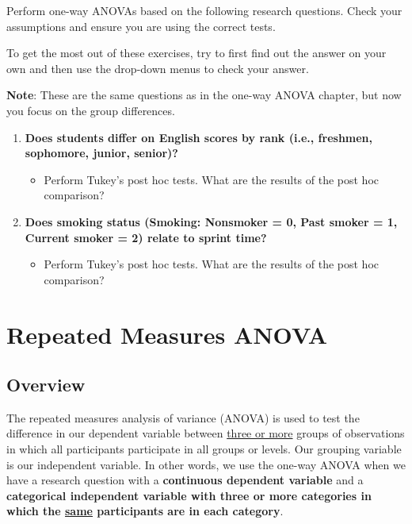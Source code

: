 \documentclass[
]{book}
\providecommand{\tightlist}{%
  \setlength{\itemsep}{0pt}\setlength{\parskip}{0pt}}
\begin{document}
Perform one-way ANOVAs based on the following research questions. Check your assumptions and ensure you are using the correct tests.

To get the most out of these exercises, try to first find out the answer on your own and then use the drop-down menus to check your answer.

\textbf{Note}: These are the same questions as in the one-way ANOVA chapter, but now you focus on the group differences.

\begin{enumerate}
\def\labelenumi{\arabic{enumi}.}
\item
  \textbf{Does students differ on English scores by rank (i.e., freshmen, sophomore, junior, senior)?}

  \begin{itemize}
  \tightlist
  \item
    Perform Tukey's post hoc tests. What are the results of the post hoc comparison?
  \end{itemize}
\item
  \textbf{Does smoking status (Smoking: Nonsmoker = 0, Past smoker = 1, Current smoker = 2) relate to sprint time?}

  \begin{itemize}
  \tightlist
  \item
    Perform Tukey's post hoc tests. What are the results of the post hoc comparison?
  \end{itemize}
\end{enumerate}

\hypertarget{repeated-measures-anova}{%
\section{Repeated Measures ANOVA}\label{repeated-measures-anova}}

\hypertarget{overview-7}{%
\subsection{Overview}\label{overview-7}}

The repeated measures analysis of variance (ANOVA) is used to test the difference in our dependent variable between \underline{three or more} groups of observations in which all participants participate in all groups or levels. Our grouping variable is our independent variable. In other words, we use the one-way ANOVA when we have a research question with a \textbf{continuous dependent variable} and a \textbf{categorical independent variable with three or more categories in which the \underline{same} participants are in each category}.
\end{document}
